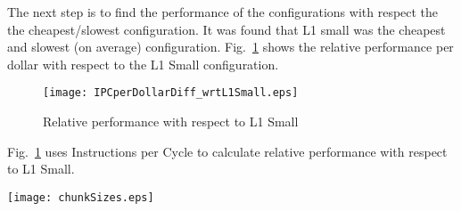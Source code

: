 \documentclass[FinalReport.tex]{subfiles}
\begin{document}
The next step is to find the performance of the configurations with respect the the cheapest/slowest configuration.  It was found that L1 small was the cheapest and slowest (on average) configuration.  Fig.~\ref{fig:IPC} shows the relative performance per dollar with respect to the L1 Small configuration.

\begin{figure}[H]
\centering
\texttt{[image: IPCperDollarDiff\_wrtL1Small.eps]}
\caption{Relative performance with respect to L1 Small\label{fig:IPC}}
\end{figure}

Fig.~\ref{fig:IPC} uses Instructions per Cycle to calculate relative performance with respect to L1 Small.  

\begin{center}
\texttt{[image: chunkSizes.eps]}
\end{center}
\end{document}
